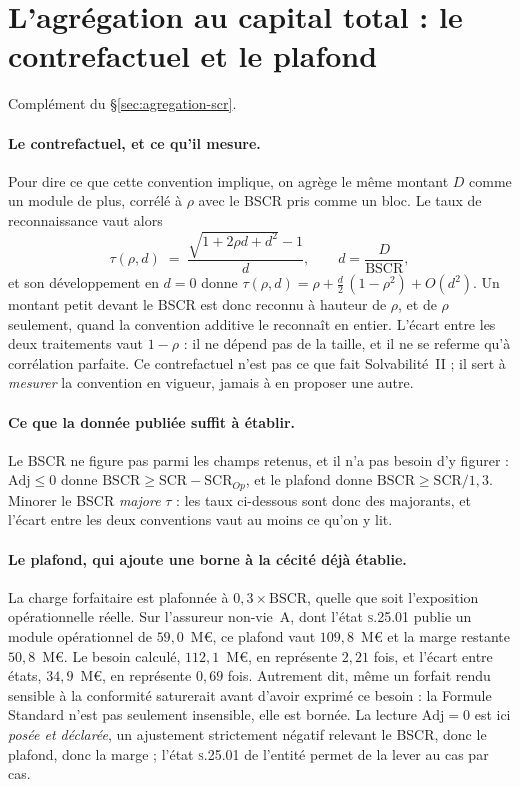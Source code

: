 \section{L'agrégation au capital total : le contrefactuel et le plafond}
\label{sec:ann-agregation}


Complément du \S\ref{sec:agregation-scr}.

\paragraph{Le contrefactuel, et ce qu'il mesure.} Pour dire ce que cette convention implique, on
agrège le même montant $D$ comme un module de plus, corrélé à $\rho$ avec le BSCR pris
comme un bloc. Le taux de reconnaissance vaut alors
\[
  \tau(\rho, d) \;=\; \frac{\sqrt{1 + 2\rho d + d^{2}} - 1}{d},
  \qquad d = \frac{D}{\mathrm{BSCR}},
\]
et son développement en $d = 0$ donne $\tau(\rho, d) = \rho + \tfrac{d}{2}\,(1 - \rho^{2}) +
O(d^{2})$. Un montant petit devant le BSCR est donc reconnu à hauteur de $\rho$,
et de $\rho$ seulement, quand la convention additive le reconnaît en entier. L'écart entre les
deux traitements vaut $1 - \rho$ : il ne dépend pas de la taille, et il ne se referme qu'à
corrélation parfaite. Ce contrefactuel n'est pas ce que fait Solvabilité~II ; il sert à
\emph{mesurer} la convention en vigueur, jamais à en proposer une autre.

\paragraph{Ce que la donnée publiée suffit à établir.} Le BSCR ne figure pas parmi les
champs retenus, et il n'a pas besoin d'y figurer : $\mathrm{Adj} \le 0$ donne
$\mathrm{BSCR} \ge \mathrm{SCR} - \mathrm{SCR}_{Op}$, et le plafond donne
$\mathrm{BSCR} \ge \mathrm{SCR}/1{,}3$. Minorer le BSCR \emph{majore} $\tau$ : les taux
ci-dessous sont donc des majorants, et l'écart entre les deux conventions vaut au moins ce qu'on
y lit.


\paragraph{Le plafond, qui ajoute une borne à la cécité déjà établie.} La charge forfaitaire est
plafonnée à $0{,}3 \times \mathrm{BSCR}$, quelle que soit l'exposition opérationnelle réelle. Sur
l'assureur non-vie~A, dont l'état \textsc{s.25.01} publie un module opérationnel de
$59{,}0$~M\euro, ce plafond vaut $109{,}8$~M\euro{} et la marge restante $50{,}8$~M\euro. Le
besoin calculé, $112{,}1$~M\euro, en représente $2{,}21$ fois, et l'écart entre états,
$34{,}9$~M\euro, en représente $0{,}69$ fois. Autrement dit, même un forfait rendu
sensible à la conformité saturerait avant d'avoir exprimé ce besoin : la Formule Standard n'est
pas seulement insensible, elle est bornée. La lecture $\mathrm{Adj} = 0$ est ici \emph{posée et
déclarée}, un ajustement strictement négatif relevant le BSCR, donc le plafond, donc la
marge ; l'état \textsc{s.25.01} de l'entité permet de la lever au cas par cas.

